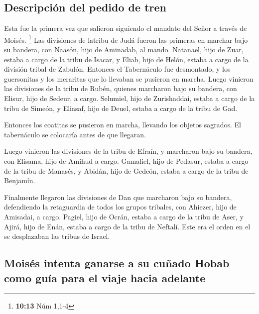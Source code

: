 \hypertarget{descripciuxf3n-del-pedido-de-tren}{%
\subsection{Descripción del pedido de
tren}\label{descripciuxf3n-del-pedido-de-tren}}

 Esta fue la primera vez que salieron siguiendo el
mandato del Señor a través de Moisés. \footnote{\textbf{10:13} Núm 1,1-4}
 Las divisiones de latribu de Judá fueron las primeras en
marchar bajo su bandera, con Naasón, hijo de Aminadab, al mando.
 Natanael, hijo de Zuar, estaba a cargo de la tribu de
Isacar,  y Eliab, hijo de Helón, estaba a cargo de la
división tribal de Zabulón.  Entonces el Tabernáculo fue
desmontado, y los guersonitas y los meraritas que lo llevaban se
pusieron en marcha.  Luego vinieron las divisiones de la
tribu de Rubén, quienes marcharon bajo su bandera, con Elisur, hijo de
Sedeur, a cargo.  Selumiel, hijo de Zurishaddai, estaba a
cargo de la tribu de Simeón,  y Eliasaf, hijo de Deuel,
estaba a cargo de la tribu de Gad.

 Entonces los coatitas se pusieron en marcha, llevando
los objetos sagrados. El tabernáculo se colocaría antes de que llegaran.

 Luego vinieron las divisiones de la tribu de Efraín, y
marcharon bajo su bandera, con Elisama, hijo de Amihud a cargo.
 Gamaliel, hijo de Pedasur, estaba a cargo de la tribu de
Manasés,  y Abidán, hijo de Gedeón, estaba a cargo de la
tribu de Benjamín.

 Finalmente llegaron las divisiones de Dan que marcharon
bajo su bandera, defendiendo la retaguardia de todos los grupos
tribales, con Ahiezer, hijo de Amisadai, a cargo. 
Pagiel, hijo de Ocrán, estaba a cargo de la tribu de Aser,
 y Ajirá, hijo de Enán, estaba a cargo de la tribu de
Neftalí.  Este era el orden en el se desplazaban las
tribus de Israel.

\hypertarget{moisuxe9s-intenta-ganarse-a-su-cuuxf1ado-hobab-como-guuxeda-para-el-viaje-hacia-adelante}{%
\subsection{Moisés intenta ganarse a su cuñado Hobab como guía para el
viaje hacia
adelante}\label{moisuxe9s-intenta-ganarse-a-su-cuuxf1ado-hobab-como-guuxeda-para-el-viaje-hacia-adelante}}

